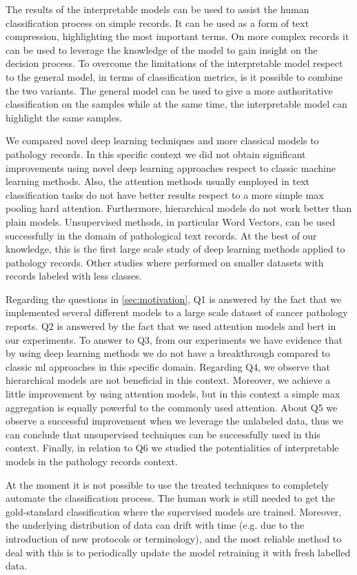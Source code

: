 The results of the interpretable models can be used to
assist the human classification process on simple records. It can be
used as
a form of text compression, highlighting the most important terms. On
more complex records it can be used to leverage the knowledge of the
model to gain insight on the decision process. To overcome the
limitations of the interpretable
model respect to the general model, in terms of
classification metrics, is it possible to combine the two variants. The
general model can be used to give a more
authoritative classification on the samples while at the same time,
the interpretable model can highlight the same samples.

We compared novel deep learning techniques and more classical models
to pathology records. In this specific context we did not obtain
significant improvements using novel deep learning approaches respect
to classic machine learning methods. Also, the attention methods
usually employed in text classification tasks do not have better
results respect to a more simple max pooling hard attention. Furthermore,
hierarchical models do not work better than plain models. Unsupervised
methods, in particular Word Vectors,
can be used successfully in the
domain of pathological text records. At the best of our knowledge, this
is the first large scale study of deep learning methods applied to
pathology records. Other studies where performed on smaller datasets
with records labeled with less classes.

Regarding the questions in \cref{sec:motivation}, Q1 is answered by
the fact that we implemented several different models to a large scale
dataset of cancer pathology reports. Q2 is answered by the fact that
we used attention models and \ac{bert} in our experiments. To answer
to Q3, from our experiments we have evidence that by using deep learning
methods we do not have a breakthrough compared to classic
\ac{ml} approaches in this specific domain. Regarding Q4, we observe
that hierarchical models are not beneficial in this context. Moreover,
we achieve a little improvement by using attention models, but in
this context a simple max aggregation is equally powerful to the
commonly used attention. About Q5 we observe a successful improvement
when we leverage the unlabeled data, thus we can conclude that
unsupervised techniques can be successfully used in this
context. Finally, in relation to Q6 we studied the potentialities of
interpretable models in the pathology records context.

At the moment it is not possible to use the treated techniques to
completely automate the classification process. The human work is
still needed to get the gold-standard classification where the
supervised models are trained. Moreover, the underlying distribution of
data can drift
with time \cite{klinkenberg2000detecting} (e.g. due to the
introduction of new protocols or terminology), and the most reliable
method to 
deal with this is to periodically update the model retraining
it with fresh labelled data.

